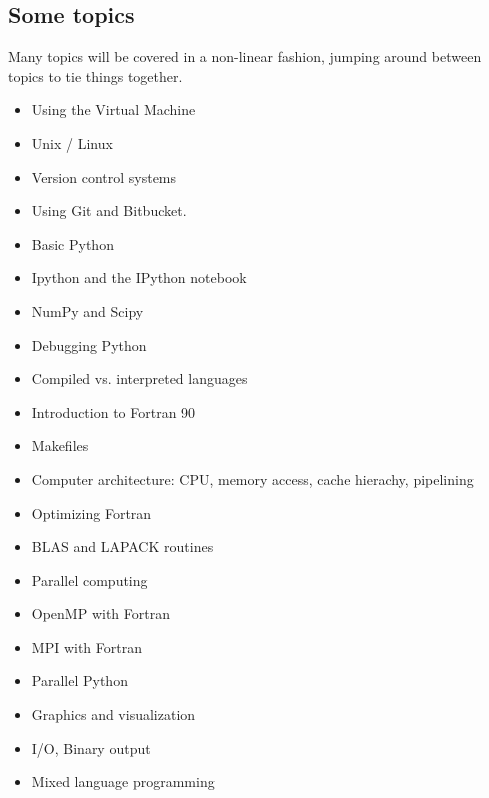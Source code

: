 \documentclass[letterpaper,10pt,english]{sphinxmanual}
\begin{document}
\subsection{Some topics}
\label{outline:some-topics}
Many topics will be covered in a non-linear fashion, jumping around between
topics to tie things together.
\begin{itemize}
\item {} 
Using the Virtual Machine

\item {} 
Unix / Linux

\item {} 
Version control systems

\item {} 
Using Git and Bitbucket.

\item {} 
Basic Python

\item {} 
Ipython and the IPython notebook

\item {} 
NumPy and Scipy

\item {} 
Debugging Python

\item {} 
Compiled vs. interpreted languages

\item {} 
Introduction to Fortran 90

\item {} 
Makefiles

\item {} 
Computer architecture: CPU, memory access, cache hierachy, pipelining

\item {} 
Optimizing Fortran

\item {} 
BLAS and LAPACK routines

\item {} 
Parallel computing

\item {} 
OpenMP with Fortran

\item {} 
MPI with Fortran

\item {} 
Parallel Python

\item {} 
Graphics and visualization

\item {} 
I/O, Binary output

\item {} 
Mixed language programming

\end{itemize}
\end{document}
